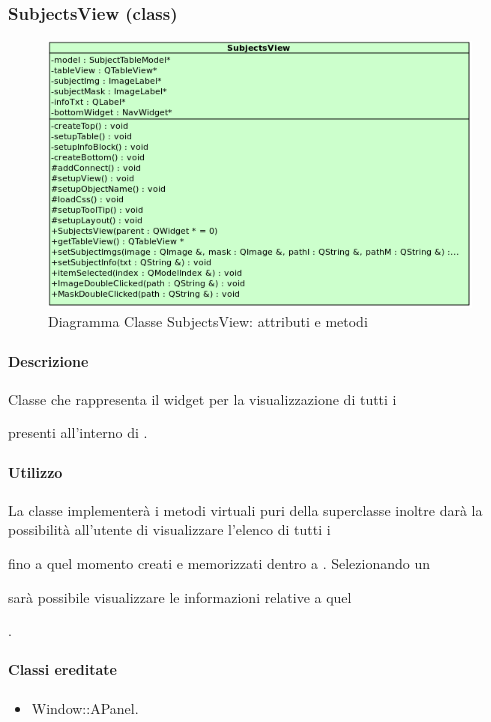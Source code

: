 \subsubsection{SubjectsView (class)}
\label{spesubV}
\begin{figure}[!h]
\centering
			\includegraphics[width=0.75\linewidth]{./Content/Immagini/view/SubjectsView.png}
			\caption{Diagramma Classe SubjectsView: attributi e metodi}
			\label{cl_subview}
\end{figure}
\paragraph{Descrizione \\}
Classe che rappresenta il widget per la visualizzazione di tutti i \subject{} presenti all'interno di \project.
\paragraph{Utilizzo\\}
La classe implementerà i metodi virtuali puri della superclasse inoltre darà la possibilità all'utente di visualizzare l'elenco di tutti i \subject{} fino a quel momento creati e memorizzati dentro a \project. Selezionando un \subject{} sarà possibile visualizzare le informazioni relative a quel \subject{}.
\paragraph{Classi ereditate\\}
\begin{itemize}
\item Window::APanel.
\end{itemize}

